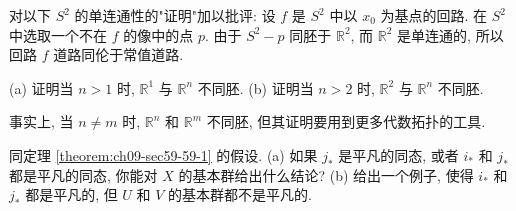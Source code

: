 \begin{exercise}
对以下 $S^{2}$ 的单连通性的"证明"加以批评: 设 $f$ 是 $S^{2}$ 中以 $x_0$ 为基点的回路. 在 $S^{2}$ 中选取一个不在 $f$ 的像中的点 $p$. 由于 $S^{2}-p$ 同胚于 $\mathbb{R}^{2}$, 而 $\mathbb{R}^{2}$ 是单连通的, 所以回路 $f$ 道路同伦于常值道路.
\end{exercise}

\begin{exercise}
(a) 证明当 $n>1$ 时, $\mathbb{R}^{1}$ 与 $\mathbb{R}^{n}$ 不同胚.
(b) 证明当 $n>2$ 时, $\mathbb{R}^{2}$ 与 $\mathbb{R}^{n}$ 不同胚.

事实上, 当 $n\neq m$ 时, $\mathbb{R}^{n}$ 和 $\mathbb{R}^{m}$ 不同胚, 但其证明要用到更多代数拓扑的工具.
\end{exercise}

\begin{exercise}
同定理 \cref{theorem:ch09-sec59-59-1} 的假设.
(a) 如果 $j_*$ 是平凡的同态, 或者 $i_*$ 和 $j_*$ 都是平凡的同态, 你能对 $X$ 的基本群给出什么结论?
(b) 给出一个例子, 使得 $i_*$ 和 $j_*$ 都是平凡的, 但 $U$ 和 $V$ 的基本群都不是平凡的.
\end{exercise}
